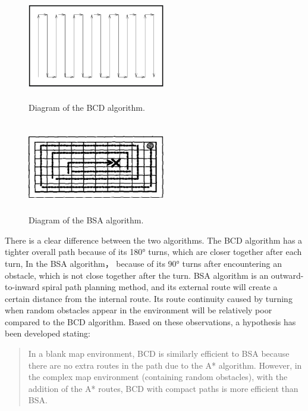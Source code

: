 \documentclass[conference]{IEEEtran}
\begin{document}
\begin{figure}[htbp]
\centering
\begin{minipage}[t]{0.48\textwidth}
\centering
\includegraphics[width=6cm,height=4cm]{RS_Report/bcd.png}
\caption{Diagram of the BCD algorithm\cite{choset1998coverage}. }
\label{bcd}
\end{minipage}
\begin{minipage}[t]{0.48\textwidth}
\centering
\includegraphics[width=6cm,height=4cm]{RS_Report/BSA.png}
\caption{Diagram of the BSA algorithm\cite{Gonzlez2003BSAAC}.}
\label{bsa}
\end{minipage}
\end{figure}

There is a clear difference between the two algorithms. The BCD algorithm has a tighter overall path because of its 180° turns, which are closer together after each turn, In the BSA algorithm， because of its 90° turns after encountering an obstacle, which is not close together after the turn. BSA algorithm is an outward-to-inward spiral path planning method, and its external route will create a certain distance from the internal route. Its route continuity caused by turning when random obstacles appear in the environment will be relatively poor compared to the BCD algorithm.
Based on these observations, a hypothesis has been developed stating:
\begin{quote}
   In a blank map environment, BCD is similarly efficient to BSA because there are no extra routes in the path due to the A* algorithm. However, in the complex map environment (containing random obstacles), with the addition of the A* routes, BCD with compact paths is more efficient than BSA.
\end{quote}
\end{document}
